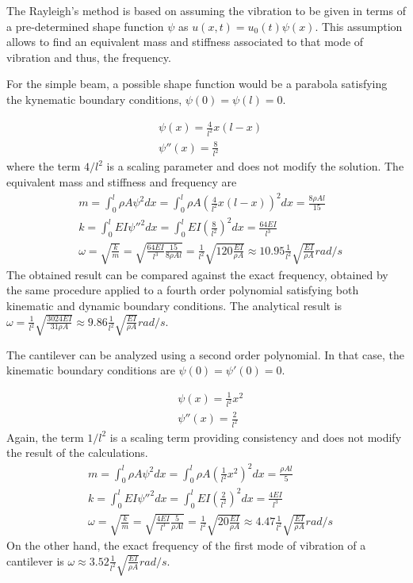 \documentclass{problems}
\begin{document}
The Rayleigh's method is based on assuming the vibration to be given in terms of a pre-determined shape function $\psi$ as $u(x,t) = u_0(t)\psi(x)$. This assumption allows to find an equivalent mass and stiffness associated to that mode of vibration and thus, the frequency.

\parbox{.7\textwidth}{For the simple beam, a possible shape function would be a parabola satisfying the kynematic boundary conditions, $\psi(0) = \psi(l) = 0$.} \hspace{1em}
\parbox{.25\textwidth}{}
\begin{align*}
&\psi(x) = \frac{4}{l^2} x (l-x) \\
&\psi''(x) = \frac{8}{l^2}
\end{align*}
where the term $4/l^2$ is a scaling parameter and does not modify the solution. The equivalent mass and stiffness and frequency are
\begin{align*}
&m = \int_0^l \rho A\psi^2dx = \int_0^l \rho A \left(\frac{4}{l^2} x (l-x)\right)^2dx = \frac{8\rho Al}{15} \\
&k = \int_0^l EI \psi''^2 dx = \int_0^l EI \left(\frac{8}{l^2}\right)^2dx = \frac{64EI}{l^3} \\
&\omega = \sqrt{\frac{k}{m}} = \sqrt{\frac{64EI}{l^3}\frac{15}{8\rho Al}} = \frac{1}{l^2}\sqrt{120\frac{EI}{\rho A}} \approx 10.95\frac{1}{l^2}\sqrt{\frac{EI}{\rho A}} rad/s
\end{align*}
The obtained result can be compared against the exact frequency, obtained by the same procedure applied to a fourth order polynomial satisfying both kinematic and dynamic boundary conditions. The analytical result is $\omega = \frac{1}{l^2}\sqrt{\frac{3024EI}{31\rho A}} \approx 9.86\frac{1}{l^2}\sqrt{\frac{EI}{\rho A}} rad/s$.

\parbox{.7\textwidth}{The cantilever can be analyzed using a second order polynomial. In that case, the kinematic boundary conditions are $\psi(0) = \psi'(0) = 0$.} \hspace{1em}
\parbox{.25\textwidth}{}
\begin{align*}
&\psi(x) = \frac{1}{l^2} x^2 \\
&\psi''(x) = \frac{2}{l^2}
\end{align*}
Again, the term $1/l^2$ is a scaling term providing consistency and does not modify the result of the calculations.
\begin{align*}
&m = \int_0^l \rho A\psi^2dx = \int_0^l \rho A \left(\frac{1}{l^2} x^2\right)^2dx = \frac{\rho Al}{5} \\
&k = \int_0^l EI \psi''^2 dx = \int_0^l EI \left(\frac{2}{l^2}\right)^2dx = \frac{4EI}{l^3} \\
&\omega = \sqrt{\frac{k}{m}} = \sqrt{\frac{4EI}{l^3}\frac{5}{\rho Al}} = \frac{1}{l^2}\sqrt{20\frac{EI}{\rho A}} \approx 4.47\frac{1}{l^2}\sqrt{\frac{EI}{\rho A}} rad/s
\end{align*}
On the other hand, the exact frequency of the first mode of vibration of a cantilever is $\omega\approx3.52\frac{1}{l^2}\sqrt{\frac{EI}{\rho A}}rad/s$.
\end{document}

